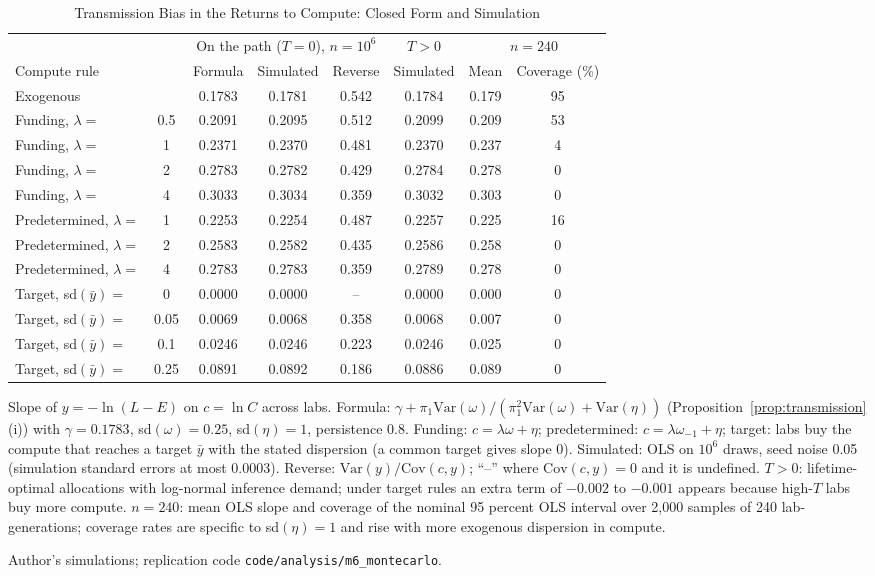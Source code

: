 \begin{table}[tp]
\centering
\caption{Transmission Bias in the Returns to Compute: Closed Form and Simulation}
\label{tab:transmission}
\footnotesize
\setlength{\tabcolsep}{4pt}
\begin{tabular}{@{}lccccccc@{}}
\toprule
 & & \multicolumn{3}{c}{On the path ($T=0$), $n=10^6$} & $T>0$ & \multicolumn{2}{c}{$n=240$} \\
\cmidrule(lr){3-5}\cmidrule(lr){6-6}\cmidrule(l){7-8}
Compute rule & & Formula & Simulated & Reverse & Simulated & Mean & Coverage (\%) \\
\midrule
Exogenous &  & 0.1783 & 0.1781 & 0.542 & 0.1784 & 0.179 & 95 \\
Funding, $\lambda=$ & 0.5 & 0.2091 & 0.2095 & 0.512 & 0.2099 & 0.209 & 53 \\
Funding, $\lambda=$ & 1 & 0.2371 & 0.2370 & 0.481 & 0.2370 & 0.237 & 4 \\
Funding, $\lambda=$ & 2 & 0.2783 & 0.2782 & 0.429 & 0.2784 & 0.278 & 0 \\
Funding, $\lambda=$ & 4 & 0.3033 & 0.3034 & 0.359 & 0.3032 & 0.303 & 0 \\
Predetermined, $\lambda=$ & 1 & 0.2253 & 0.2254 & 0.487 & 0.2257 & 0.225 & 16 \\
Predetermined, $\lambda=$ & 2 & 0.2583 & 0.2582 & 0.435 & 0.2586 & 0.258 & 0 \\
Predetermined, $\lambda=$ & 4 & 0.2783 & 0.2783 & 0.359 & 0.2789 & 0.278 & 0 \\
Target, sd$(\bar y)=$ & 0 & 0.0000 & 0.0000 & -- & 0.0000 & 0.000 & 0 \\
Target, sd$(\bar y)=$ & 0.05 & 0.0069 & 0.0068 & 0.358 & 0.0068 & 0.007 & 0 \\
Target, sd$(\bar y)=$ & 0.1 & 0.0246 & 0.0246 & 0.223 & 0.0246 & 0.025 & 0 \\
Target, sd$(\bar y)=$ & 0.25 & 0.0891 & 0.0892 & 0.186 & 0.0886 & 0.089 & 0 \\
\bottomrule
\end{tabular}
\par\smallskip
\begin{tablenotes}Slope of $y=-\ln(L-E)$ on $c=\ln C$ across labs. Formula: $\gamma+\pi_1\mathrm{Var}(\omega)/(\pi_1^2\mathrm{Var}(\omega)+\mathrm{Var}(\eta))$ (Proposition~\ref{prop:transmission}(i)) with $\gamma=0.1783$, sd$(\omega)=0.25$, sd$(\eta)=1$, persistence 0.8. Funding: $c=\lambda\omega+\eta$; predetermined: $c=\lambda\omega_{-1}+\eta$; target: labs buy the compute that reaches a target $\bar y$ with the stated dispersion (a common target gives slope 0). Simulated: OLS on $10^6$ draws, seed noise 0.05 (simulation standard errors at most 0.0003). Reverse: $\mathrm{Var}(y)/\mathrm{Cov}(c,y)$; ``--'' where $\mathrm{Cov}(c,y)=0$ and it is undefined. $T>0$: lifetime-optimal allocations with log-normal inference demand; under target rules an extra term of $-0.002$ to $-0.001$ appears because high-$T$ labs buy more compute. $n=240$: mean OLS slope and coverage of the nominal 95 percent OLS interval over 2,000 samples of 240 lab-generations; coverage rates are specific to sd$(\eta)=1$ and rise with more exogenous dispersion in compute.\end{tablenotes}
\begin{tablenotes}[Source]Author's simulations; replication code \texttt{code/analysis/m6\_montecarlo}.\end{tablenotes}
\end{table}
